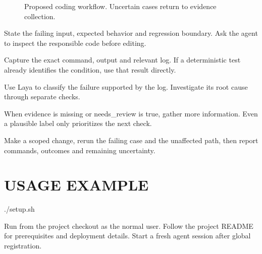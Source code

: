 \documentclass[10pt,a4paper]{article}
\begin{document}
\begin{figure}[H]
\centering
{}
\caption{Proposed coding workflow. Uncertain cases return to evidence collection.}
\end{figure}
State the failing input, expected behavior and regression boundary. Ask the agent to inspect the responsible code before editing.

Capture the exact command, output and relevant log. If a deterministic test already identifies the condition, use that result directly.

Use Laya to classify the failure supported by the log. Investigate its root cause through separate checks.

When evidence is missing or needs\_review is true, gather more information. Even a plausible label only prioritizes the next check.

Make a scoped change, rerun the failing case and the unaffected path, then report commands, outcomes and remaining uncertainty.

\section{USAGE EXAMPLE}
\begin{Code}
./setup.sh
\end{Code}
Run from the project checkout as the normal user. Follow the project README for prerequisites and deployment details. Start a fresh agent session after global registration.
\end{document}
